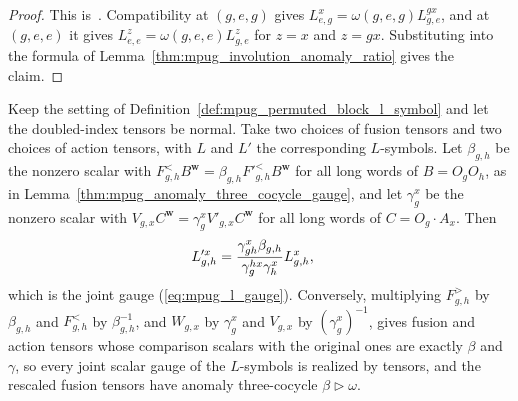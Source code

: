 \begin{proof}\leanok
    This is~\cite[``The involution ratio from the self-pair and identity
        L-symbols'']{QICLean2026Blueprint}.
    Compatibility at $(g,e,g)$ gives $L^x_{e,g}=\omega(g,e,g)L^{gx}_{g,e}$,
    and at $(g,e,e)$ it gives $L^z_{e,e}=\omega(g,e,e)L^z_{g,e}$ for $z=x$ and
    $z=gx$. Substituting into the formula of
    Lemma~\ref{thm:mpug_involution_anomaly_ratio} gives the claim.
\end{proof}

\begin{lemma}
    \label{lem:mpug_permuted_block_l_gauge}
    \leanok
    Keep the setting of Definition~\ref{def:mpug_permuted_block_l_symbol}
    and let the doubled-index tensors be normal. Take two choices of fusion
    tensors and two choices of action tensors, with $L$ and $L'$ the
    corresponding $L$-symbols. Let $\beta_{g,h}$ be the nonzero scalar with
    $F^<_{g,h}B^{\mathbf w}=\beta_{g,h}F'^<_{g,h}B^{\mathbf w}$ for all long
    words of $B=O_gO_h$, as in
    Lemma~\ref{thm:mpug_anomaly_three_cocycle_gauge}, and let $\gamma^x_g$ be
    the nonzero scalar with
    $V_{g,x}C^{\mathbf w}=\gamma^x_gV'_{g,x}C^{\mathbf w}$ for all long words
    of $C=O_g\cdot A_x$. Then
    \begin{align}
        L'^x_{g,h}
         & =\frac{\gamma^x_{gh}\beta_{g,h}}{\gamma^{hx}_g\gamma^x_h}L^x_{g,h},
        \notag
    \end{align}
    which is the joint gauge (\ref{eq:mpug_l_gauge}). Conversely,
    multiplying $F^>_{g,h}$ by $\beta_{g,h}$ and $F^<_{g,h}$ by
    $\beta_{g,h}^{-1}$, and $W_{g,x}$ by $\gamma^x_g$ and $V_{g,x}$ by
    $(\gamma^x_g)^{-1}$, gives fusion and action tensors whose comparison
    scalars with the original ones are exactly $\beta$ and $\gamma$, so every
    joint scalar gauge of the $L$-symbols is realized by tensors, and the
    rescaled fusion tensors have anomaly three-cocycle
    $\beta\mathbin{\triangleright}\omega$.


\end{lemma}
